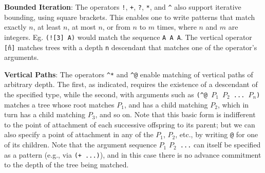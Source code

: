 \documentclass[a4,11pt]{article}
\begin{document}
{\bf Bounded Iteration}:
The operators \texttt{!}, \texttt{+}, \texttt{?}, \texttt{*}, and \texttt{\^} also support iterative bounding, using square brackets.  This enables one to write patterns that match exactly $n$, at least $n$, at most $n$, or from $n$ to $m$ times, where $n$ and $m$ are integers.   Eg. \texttt{(![3] A)} would match the sequence \texttt{A A A}. The vertical operator \texttt{\^[n]} matches trees with a depth \texttt{n} descendant that matches one of the operator's arguments.


{\bf Vertical Paths}:
The operators \texttt{\^{}*} and \texttt{\^{}@} enable matching of vertical paths of arbitrary depth. The first, as indicated, requires the existence of a descendant of the specified type, while the second, with arguments such as \texttt{(\^{}@ $P_1$ $P_2$ ... $P_n$)} matches a tree whose root matches \texttt{$P_1$}, and has a child matching \texttt{$P_2$}, which in turn has a child matching \texttt{$P_3$}, and so on. Note that this basic form is indifferent to the point of attachment of each successive offspring to its parent; but we can also specify a point of attachment in any of the \texttt{$P_1$}, \texttt{$P_2$}, etc., by writing \texttt{@} for one of its children. Note that the argument sequence \texttt{$P_1$} \texttt{$P_2$ ...} can itself be specified as a pattern (e.g., via \texttt{(+ ...)}), and in this case there is no advance commitment to the depth of the tree being matched.


\end{document}
